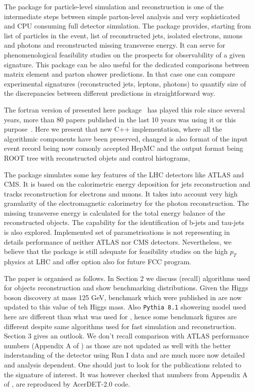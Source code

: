 The package for particle-level simulation and reconstruction 
is  one of the intermediate steps between 
simple parton-level analysis and very sophisticated and CPU consuming
full detector simulation. The package provides, starting
from  list of particles in the event, list of reconstructed
jets, isolated electrons, muons and photons and
reconstructed missing transverse energy.
It can serve for phenomenological feasibility studies on the prospects 
for observability of a given signature. 
This package can be also useful for the dedicated comparisons between
matrix element and parton shower predictions. In that case one can
compare experimental signatures (reconstructed jets,
leptons, photons) to quantify size of the discrepancies between
different predictions in straightforward way. 

The fortran version of presented here package~\cite{AcerDET-1.0} has played this role 
since several years, more than 80 papers published in the last 10 years was using
it or this purpose~\cite{AcerDET-1.0-citations}. 
Here we present that new C++ implementation, where all the algorithmic components
have been preserved, changed is also format of the input event record being now
comonly accepted HepMC and the output format being ROOT tree with reconstructed 
objets and control histograms,

The package simulates some key features of the LHC detectors like
ATLAS and CMS. It is based on the calorimetric energy deposition for
jets reconstruction and tracks reconstruction for electrons and muons. 
It takes into account very high granularity of the electromagnetic calorimetry
for the photon reconstruction. The missing transverse energy is
calculated for the total energy balance of the reconstructed objects.
The capability for the identification of b-jets and tau-jets is also
explored. Implemented set of parametrisations is 
not representing in details performance of neither ATLAS nor
CMS detectors. 
Nevertheless, we believe that the package is still adequate for 
feasibility studies on the high $p_T$ physics at LHC and offer option
also for future FCC program. 


The paper is organised as follows. In Section 2 we discuss (recall) algorithms
used for objects reconstruction and show benchmarking distributions. 
Given the Higgs boson discovery at mass 125 GeV, benchmark which were published
in \cite{AcerDET-1.0} are now updated to this value of teh Higgs mass. 
Also  {\tt Pythia 8.1} showering model used here are different than what was 
used for \cite{AcerDET-1.0}, hence some benchmark figures are different despite
same algorithms used for fast simulation and reconstruction. 
Section 3 gives an outlook. 
We don't recall comparison with ATLAS performance numbers 
(Appendix A of \cite{AcerDET-1.0}) as those are not updated as well with the better
inderstanding of the detector using Run I data and are much more now detailed and 
analysis dependent. One should just to look for the publications related to the 
signature of interest. It was however checked that numbers from Appendix A of 
\cite{AcerDET-1.0}, are reproduced by  AcerDET-2.0 code. 

